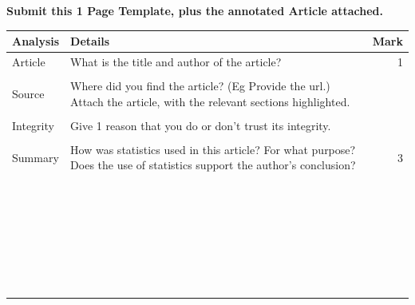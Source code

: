 \documentclass[bigtut]{quiz}\usepackage[]{graphicx}\usepackage[]{color}
\begin{document}
\begin{tutorial}
\newpage
{}  {\tiny \bf  Submit this 1 Page Template, plus the annotated Article attached.}

\begin{tabular}{|l|l|r|} \hline
{\bf Analysis} & {\bf Details} \hspace{11cm} & {\bf Mark} \\ \hline
Article & {\tiny What is the title and author of the article?} & 1  \\
& & \\ 
Source & {\tiny Where did you find the article? (Eg Provide the url.) Attach the article, with the relevant sections highlighted.} \hspace{.5cm} &  \\ 
& & \\ 
Integrity &  {\tiny Give 1 reason that you do or don't trust its integrity.} &   \\ 
& & \\ \hline
Summary & {\tiny How was statistics used in this article? For what purpose? Does the use of statistics support the author's conclusion?} & 3 \\
&  & \\ 
& & \\ 
& & \\ 
& & \\ 
& & \\  
& & \\ 
& & \\ 
& & \\  
& & \\
& & \\ 
& & \\ 
& & \\ 
& & \\ 
& & \\ 
& & \\ 
& & \\ 
& & \\ 
& & \\ 
& & \\ 
& & \\ 
& & \\ 
& & \\ 
& & \\ 
& & \\ 
& & \\ 
& & \\ 
& & \\ 
& & \\
& & \\ 

\end{tabular}
\end{tutorial}
\end{document}
